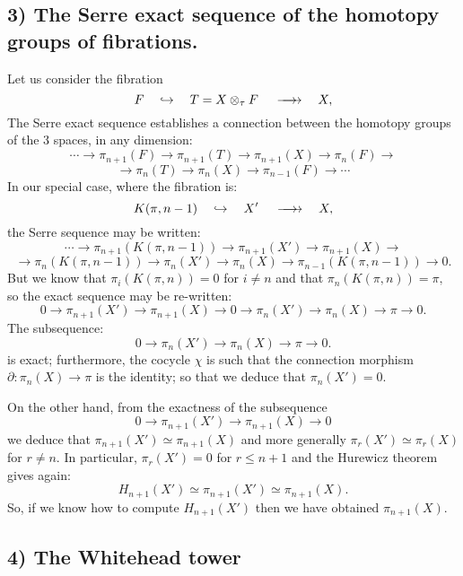 \subsection* {3) The Serre exact sequence of the homotopy groups of fibrations.}

Let us consider the fibration
$$  F \quad \hookrightarrow\quad  T=X \otimes_\tau F \hskip 1.2em \longrightarrow \hskip -1.2em \longrightarrow  
   \quad X,$$
The Serre exact sequence establishes a connection between the homotopy groups of the $3$ spaces,
in any  dimension:
$$\cdots \longrightarrow \pi_{n+1}(F) \longrightarrow \pi_{n+1}(T) \longrightarrow \pi_{n+1}(X) 
         \longrightarrow \pi_n(F) \longrightarrow$$
$$\longrightarrow  \pi_n(T) \longrightarrow \pi_n(X)  \longrightarrow \pi_{n-1}(F) \longrightarrow \cdots $$
In our special case, where the fibration is:
$$  K(\pi, n-1) \quad \hookrightarrow\quad  X' \hskip 1.2em \longrightarrow \hskip -1.2em \longrightarrow  
   \quad X,$$
the Serre sequence may be written:
$$\cdots \longrightarrow  \pi_{n+1}(K(\pi, n-1)) \longrightarrow \pi_{n+1}(X') \longrightarrow \pi_{n+1}(X)
 \longrightarrow $$
$$ \longrightarrow \pi_n(K(\pi, n-1)) \longrightarrow  \pi_n(X') \longrightarrow \pi_n(X) 
 \longrightarrow \pi_{n-1}(K(\pi, n-1)) \longrightarrow 0. $$
But we know that $\pi_i(K(\pi,n))=0$ for $i \not= n$ and that $\pi_n(K(\pi, n))=\pi,$
so the exact sequence may be re-written:
$$  0 \rightarrow \pi_{n+1}(X') \rightarrow \pi_{n+1}(X) \rightarrow 0 \rightarrow  \pi_n(X') 
      \rightarrow \pi_n(X) \rightarrow \pi \rightarrow 0. $$
The  subsequence:
$$ 0 \longrightarrow  \pi_n(X') \longrightarrow \pi_n(X) 
 \longrightarrow \pi \longrightarrow 0. $$
is exact; furthermore, the cocycle $\chi$ is such that the connection morphism
$\partial: \pi_n(X) \rightarrow \pi$ is the identity; so that
we deduce that $ \pi_n (X')=0 $.
\par
On the other hand, from the exactness of the subsequence
$$  0 \longrightarrow \pi_{n+1}(X') \longrightarrow \pi_{n+1}(X)
 \longrightarrow 0 $$
we deduce that $ \pi_{n+1}(X') \simeq \pi_{n+1}(X)$
and more generally $ \pi_r(X') \simeq \pi_r(X)$ for $r \not= n.$
In particular, $\pi_r(X')=0$ for $r \leq n+1$ and the Hurewicz theorem gives again:
$$ H_{n+1}(X') \simeq \pi_{n+1}(X') \simeq  \pi_{n+1}(X).$$
So, if we know how to compute $H_{n+1}(X')$ then we  have obtained $\pi_{n+1}(X).$

\subsection* {4) The Whitehead tower}

